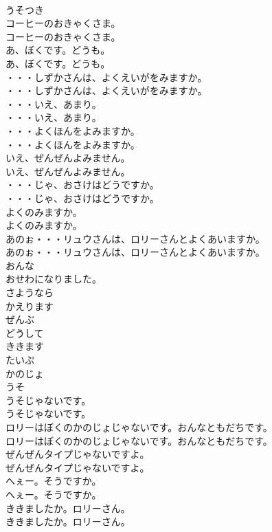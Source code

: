 \documentclass[8pt]{extreport}
\begin{document}
\begin{CJK}{UTF8}{min}
\\	うそつき
\\	コーヒーのおきゃくさま。	
\\	コーヒーのおきゃくさま。 
\\	あ、ぼくです。どうも。	
\\	あ、ぼくです。どうも。 
\\	・・・しずかさんは、よくえいがをみますか。	
\\	・・・しずかさんは、よくえいがをみますか。 
\\	・・・いえ、あまり。	
\\	・・・いえ、あまり。 
\\	・・・よくほんをよみますか。	
\\	・・・よくほんをよみますか。 
\\	いえ、ぜんぜんよみません。	
\\	いえ、ぜんぜんよみません。 
\\	・・・じゃ、おさけはどうですか。	
\\	・・・じゃ、おさけはどうですか。 
\\	よくのみますか。	
\\	よくのみますか。 
\\	あのぉ・・・リュウさんは、ロリーさんとよくあいますか。	
\\	あのぉ・・・リュウさんは、ロリーさんとよくあいますか。 
\\	おんな
\\	おせわになりました。
\\	さようなら
\\	かえります
\\	ぜんぶ
\\	どうして
\\	ききます
\\	たいぷ
\\	かのじょ
\\	うそ
\\	うそじゃないです。	
\\	うそじゃないです。 
\\	ロリーはぼくのかのじょじゃないです。おんなともだちです。	
\\	ロリーはぼくのかのじょじゃないです。おんなともだちです。 
\\	ぜんぜんタイプじゃないですよ。	
\\	ぜんぜんタイプじゃないですよ。 
\\	へぇー。そうですか。	
\\	へぇー。そうですか。 
\\	ききましたか。ロリーさん。	
\\	ききましたか。ロリーさん。 

\end{CJK}
\end{document}
